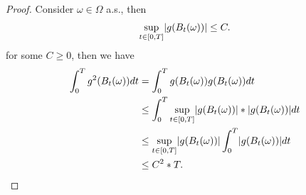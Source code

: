 \begin{proof}
 Consider $\omega \in  \Omega $ a.s., then 
 \begin{align*}
   \sup_{t \in  [0,T]}\lvert g(B_t(\omega ))\rvert \le C 
 .\end{align*}
 for some $C\ge 0$, then we have 
\begin{align*}
  \int_0^{T}  g^2(B_t(\omega )) dt &=  \int_0^{T}  g(B_t(\omega ))g(B_t(\omega)) dt\\
                                   &\le \int_0^{T}  \sup_{t \in  [0,T]} \lvert g(B_t(\omega ))\rvert* \lvert g(B_t(\omega))\rvert dt\\
                                   &\le  \sup_{t \in  [0,T]} \lvert g(B_t(\omega ))\rvert\int_0^{T} \lvert g(B_t(\omega))\rvert dt\\
                                   &\le C^2*T 
.\end{align*}
\end{proof}
